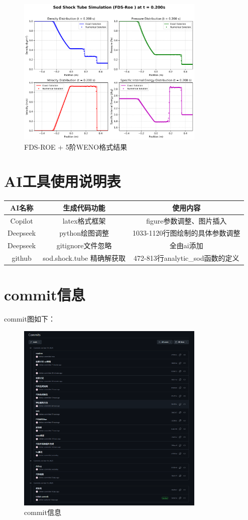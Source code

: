 \documentclass[12pt,a4paper]{article}
\begin{document}
\begin{figure}[!htbp]
    \centering
    \includegraphics[width=0.8\textwidth]{Sod_Shock_FDS-Roe _t_0p200s.png}
    \caption{FDS-ROE + 5阶WENO格式结果}
\end{figure}


\section{AI工具使用说明表}
\begin{table}[!htbp]
    \centering
    \begin{tabular}{|c|c|c|}
        \hline
        \textbf{AI名称} & \textbf{生成代码功能} & \textbf{使用内容} \\
        \hline
        Copilot & latex格式框架 & figure参数调整、图片插入\\
        \hline
        Deepseek & python绘图调整 & 1033-1120行图绘制的具体参数调整\\
        \hline
        Deepseek & gitignore文件忽略 & 全由ai添加\\
        \hline
        github & sod.shock.tube 精确解获取 & 472-813行analytic\_sod函数的定义\\
        \hline
\end{tabular}
\end{table}
\section{commit信息}
commit图如下：
\begin{figure}[!htbp]
    \centering
    \includegraphics[width=0.8\textwidth]{commits.png}
    \caption{commit信息}
\end{figure}
\end{document}
